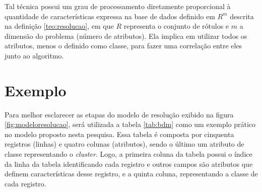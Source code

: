 
Tal técnica possui um grau de processamento diretamente proporcional à quantidade de características expressa na base de dados definido em ${R^m}$ descrita na definição  \ref{teo:resolucao}, em que ${R}$ representa o conjunto de rótulos e ${m}$ a dimensão do problema (número de atributos). Ela implica em utilizar todos os atributos, menos o definido como classe, para fazer uma correlação entre eles junto ao algoritmo. 



\section{Exemplo} \label{cap:ferramentas:sec:exebasemodfic}

Para melhor esclarecer as etapas do modelo de resolução exibido na figura \ref{fig:modeloresolucao}, será utilizada a tabela \ref{tab:bdm} como um exemplo prático no modelo proposto nesta pesquisa. Essa tabela é composta por cinquenta registros (linhas) e quatro colunas (atributos), sendo o último um atributo de classe representando o \textit{cluster}. Logo, a primeira coluna da tabela possui o índice da linha da tabela identificando cada registro e outros campos são atributos que definem características desse registro, e a quinta coluna, representando a classe de cada registro.


